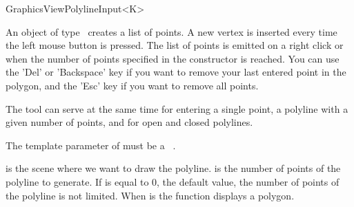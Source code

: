 \begin{ccRefClass}[Qt::]{GraphicsViewPolylineInput<K>}

\ccDefinition
An object of type \ccRefName\ creates a list of points. A new 
vertex is inserted every time the left mouse button is pressed.
The list of points is emitted on a right click or when the number of
points specified in the constructor is reached. You can use the 'Del'
or 'Backspace' key if you want to remove your last entered point in the polygon,
and the 'Esc' key if you want to remove all points.

The tool can serve at the same time for entering a single point,
a polyline with a given number of points, and for open and closed
polylines.


\ccParameters

The template parameter of  must be a \cgal\ . 

\ccInheritsFrom
{}

\ccGlue

\ccCreation
{}

{ is the scene where we want to draw the polyline.  is the
  number of points of the polyline to generate. If  is equal to 0,
  the default value, the number of points of the polyline is not
  limited. When  is  the function displays a
  polygon.}


\end{ccRefClass}







